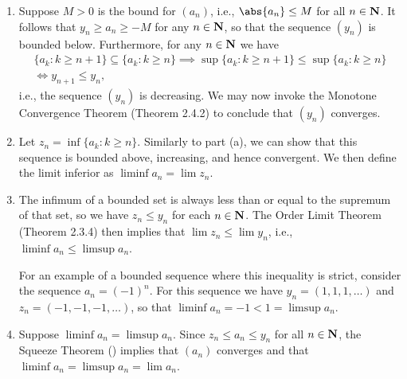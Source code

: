 \documentclass{lew98_solutions}
\begin{document}
\begin{solution}
    \begin{enumerate}
        \item Suppose \( M > 0 \) is the bound for \( (a_n) \), i.e., \( \abs{a_n} \leq M \) for all \( n \in \mathbf{N} \). It follows that \( y_n \geq a_n \geq -M \) for any \( n \in \mathbf{N} \), so that the sequence \( (y_n) \) is bounded below. Furthermore, for any \( n \in \mathbf{N} \) we have
        \begin{multline*}
            \{ a_k : k \geq n + 1 \} \subseteq \{ a_k : k \geq n \} \implies \sup \{ a_k : k \geq n + 1 \} \leq \sup \{ a_k : k \geq n \} \\[2mm]
            \iff y_{n+1} \leq y_n,
        \end{multline*}
        i.e., the sequence \( (y_n) \) is decreasing. We may now invoke the Monotone Convergence Theorem (Theorem 2.4.2) to conclude that \( (y_n) \) converges.

        \item Let \( z_n = \inf \{ a_k : k \geq n \} \). Similarly to part (a), we can show that this sequence is bounded above, increasing, and hence convergent. We then define the limit inferior as \( \liminf a_n = \lim z_n \).

        \item The infimum of a bounded set is always less than or equal to the supremum of that set, so we have \( z_n \leq y_n \) for each \( n \in \mathbf{N} \). The Order Limit Theorem (Theorem 2.3.4) then implies that \( \lim z_n \leq \lim y_n \), i.e., \( \liminf a_n \leq \limsup a_n \).

        For an example of a bounded sequence where this inequality is strict, consider the sequence \( a_n = (-1)^n \). For this sequence we have \( y_n = (1, 1, 1, \ldots) \) and \( z_n = (-1, -1, -1, \ldots ) \), so that \( \liminf a_n = -1 < 1 = \limsup a_n \).

        \item Suppose \( \liminf a_n = \limsup a_n \). Since \( z_n \leq a_n \leq y_n \) for all \( n \in \mathbf{N} \), the Squeeze Theorem () implies that \( (a_n) \) converges and that \( \liminf a_n = \limsup a_n = \lim a_n \).
        

\end{enumerate}
\end{solution}
\end{document}
